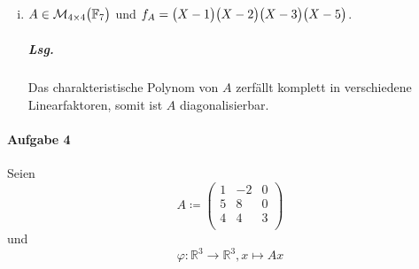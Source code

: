 \documentclass{scrreprt}
\begin{document}
\begin{enumerate}[(i)]
\item $A \in \mathcal{M}_{4 \times 4} \qty\big(\mathbb{F}_7)$ und
  $f_A = \qty\big(X - 1)\qty\big(X - 2)\qty\big(X - 3)\qty\big(X - 5)$.

  \subparagraph{Lsg.} Das charakteristische Polynom von $A$ zerfällt komplett in
  verschiedene Linearfaktoren, somit ist $A$ diagonalisierbar.
\end{enumerate}

\newpage
\paragraph{Aufgabe 4} Seien
\[
  A \coloneqq \begin{pmatrix}
    1 & -2 & 0 \\
    5 & 8 & 0 \\
    4 & 4 & 3 \\
  \end{pmatrix}
\]
und
\[
  \varphi \colon \mathbb{R}^3 \to \mathbb{R}^3, x \mapsto Ax
\]
\end{document}
